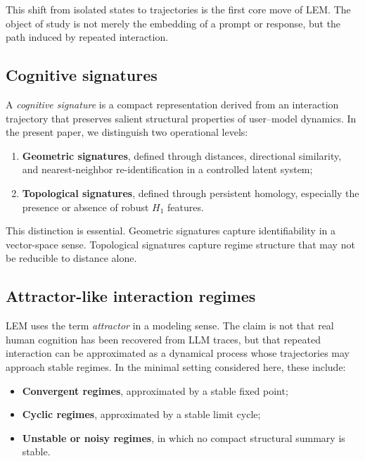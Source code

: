 \documentclass[11pt]{article}
\begin{document}
This shift from isolated states to trajectories is the first
core move of LEM. The object of study is not merely the
embedding of a prompt or response, but the path induced by
repeated interaction.

\subsection{Cognitive signatures}

A \emph{cognitive signature} is a compact representation
derived from an interaction trajectory that preserves salient
structural properties of user--model dynamics. In the present
paper, we distinguish two operational levels:
\begin{enumerate}[leftmargin=1.5em]
  \item \textbf{Geometric signatures}, defined through
        distances, directional similarity, and
        nearest-neighbor re-identification in a controlled
        latent system;
  \item \textbf{Topological signatures}, defined through
        persistent homology, especially the presence or
        absence of robust $H_1$ features.
\end{enumerate}

This distinction is essential. Geometric signatures capture
identifiability in a vector-space sense. Topological
signatures capture regime structure that may not be reducible
to distance alone.

\subsection{Attractor-like interaction regimes}

LEM uses the term \emph{attractor} in a modeling sense. The
claim is not that real human cognition has been recovered from
LLM traces, but that repeated interaction can be approximated
as a dynamical process whose trajectories may approach stable
regimes. In the minimal setting considered here, these
include:
\begin{itemize}[leftmargin=1.5em]
  \item \textbf{Convergent regimes}, approximated by a
        stable fixed point;
  \item \textbf{Cyclic regimes}, approximated by a stable
        limit cycle;
  \item \textbf{Unstable or noisy regimes}, in which no
        compact structural summary is stable.
\end{itemize}
\end{document}
